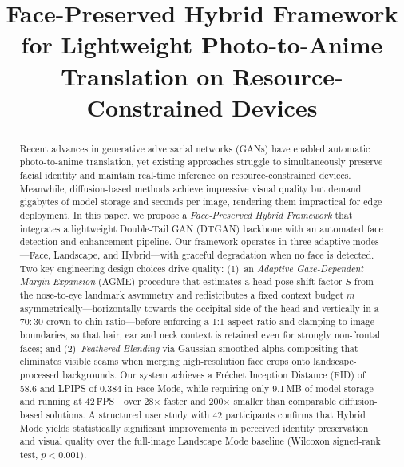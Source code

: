 \documentclass[journal]{IEEEtran}
\begin{document}
\title{Face-Preserved Hybrid Framework for Lightweight Photo-to-Anime Translation on Resource-Constrained Devices}

\author{
}

\maketitle
\begin{abstract}
Recent advances in generative adversarial networks (GANs) have enabled automatic photo-to-anime translation, yet existing approaches struggle to simultaneously preserve facial identity and maintain real-time inference on resource-constrained devices. Meanwhile, diffusion-based methods achieve impressive visual quality but demand gigabytes of model storage and seconds per image, rendering them impractical for edge deployment. In this paper, we propose a \textit{Face-Preserved Hybrid Framework} that integrates a lightweight Double-Tail GAN (DTGAN) backbone with an automated face detection and enhancement pipeline. Our framework operates in three adaptive modes---Face, Landscape, and Hybrid---with graceful degradation when no face is detected. Two key engineering design choices drive quality: (1)~an \textit{Adaptive Gaze-Dependent Margin Expansion} (AGME) procedure that estimates a head-pose shift factor $S$ from the nose-to-eye landmark asymmetry and redistributes a fixed context budget $m$ asymmetrically---horizontally towards the occipital side of the head and vertically in a $70{:}30$ crown-to-chin ratio---before enforcing a 1:1 aspect ratio and clamping to image boundaries, so that hair, ear and neck context is retained even for strongly non-frontal faces; and (2)~\textit{Feathered Blending} via Gaussian-smoothed alpha compositing that eliminates visible seams when merging high-resolution face crops onto landscape-processed backgrounds. Our system achieves a Fr\'{e}chet Inception Distance (FID) of 58.6 and LPIPS of 0.384 in Face Mode, while requiring only 9.1\,MB of model storage and running at 42\,FPS---over 28$\times$ faster and 200$\times$ smaller than comparable diffusion-based solutions. A structured user study with 42 participants confirms that Hybrid Mode yields statistically significant improvements in perceived identity preservation and visual quality over the full-image Landscape Mode baseline (Wilcoxon signed-rank test, $p < 0.001$).
\end{abstract}
\end{document}

